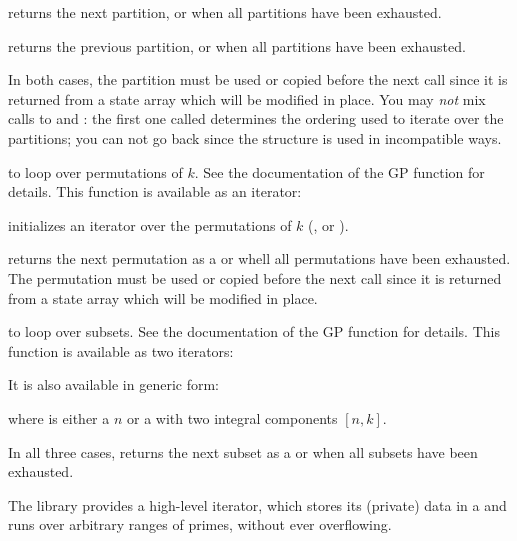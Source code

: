    returns the next partition, or
   when all partitions have been exhausted.

   returns the previous partition, or
   when all partitions have been exhausted.

  In both cases, the partition must be used or copied before the next call
  since it is returned from a state array which will be modified in place.
  You may \emph{not} mix calls to  and :
  the first one called determines the ordering used to iterate over the
  partitions; you can not go back since the  structure is used
  in incompatible ways.

\item {} to loop over permutations of $k$. See the documentation
  of the  GP function for details. This function is available as
  an iterator:

   initializes an iterator
  over the permutations of $k$ (,  or ).

   returns the next permutation
  as a  or  whell all permutations have been
  exhausted. The permutation must be used or copied before the next call
  since it is returned from a state array which will be modified in place.

\item {} to loop over subsets. See the documentation
  of the  GP function for details. This function
  is available as two iterators:



  \noindent It is also available in generic form:

   where  is either
  a  $n$ or a  with two integral components $[n,k]$.

  In all three cases,  returns the
  next subset as a  or  when all subsets have been
  exhausted.

\label{se:primeiter}

The library provides a high-level iterator, which stores its (private) data
in a   and runs over arbitrary ranges of primes,
without ever overflowing.

